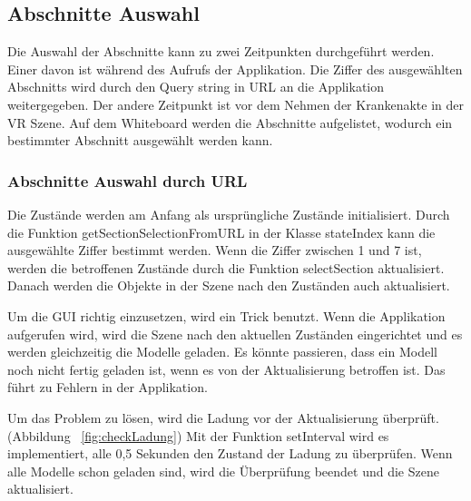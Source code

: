  \subsection{Abschnitte Auswahl}
 Die Auswahl der Abschnitte kann zu zwei Zeitpunkten durchgeführt werden. Einer davon ist während des Aufrufs der Applikation. Die Ziffer des ausgewählten Abschnitts wird durch den Query string in URL an die Applikation weitergegeben. Der andere Zeitpunkt ist vor dem Nehmen der Krankenakte in der VR Szene. Auf dem Whiteboard werden die Abschnitte aufgelistet, wodurch ein bestimmter Abschnitt ausgewählt werden kann.
 
  \subsubsection{Abschnitte Auswahl durch URL}
  Die Zustände werden am Anfang als ursprüngliche Zustände initialisiert. Durch die Funktion {\selectfont getSectionSelectionFromURL} in der Klasse {\selectfont stateIndex} kann die ausgewählte Ziffer bestimmt werden. Wenn die Ziffer zwischen 1 und 7 ist, werden die betroffenen Zustände durch die Funktion {\selectfont selectSection} aktualisiert. Danach werden die Objekte in der Szene nach den Zuständen auch aktualisiert.
  
  Um die GUI richtig einzusetzen, wird ein Trick benutzt. Wenn die Applikation aufgerufen wird, wird die Szene nach den aktuellen Zuständen eingerichtet und es werden gleichzeitig die Modelle geladen. Es könnte passieren, dass ein Modell noch nicht fertig geladen ist, wenn es von der Aktualisierung betroffen ist. Das führt zu Fehlern in der Applikation.
  
  Um das Problem zu lösen, wird die Ladung vor der Aktualisierung überprüft.(Abbildung ~\ref{fig:checkLadung}) Mit der Funktion {\selectfont setInterval} wird es implementiert, alle 0,5 Sekunden den Zustand der Ladung zu überprüfen. Wenn alle Modelle schon geladen sind, wird die Überprüfung beendet und die Szene aktualisiert.
  
